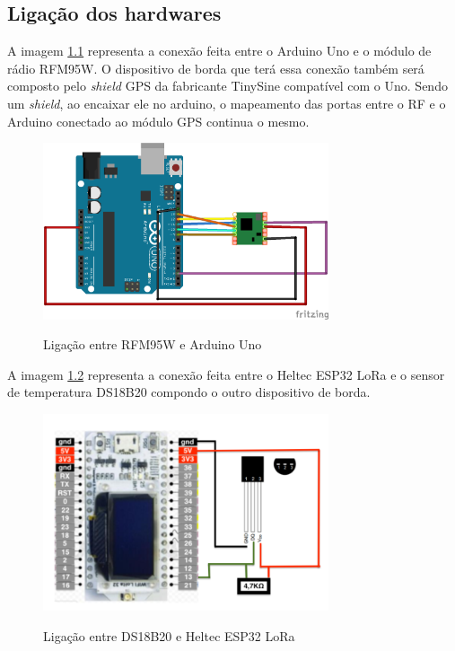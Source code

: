 \documentclass[
    hidelinks,
	12pt,				%
	openany,
	oneside, 
	a4paper,			%
	english,			%
	french,				%
	spanish,			%
	brazil				%
	]{abntex2}
\begin{document}

\begin{anexosenv}

\partanexos

\chapter{Ligação dos hardwares} \label{anexohardware}

A imagem \ref{fig:unowire} representa a conexão feita entre o Arduino Uno e o módulo de rádio RFM95W. O dispositivo de borda que terá essa conexão também será composto pelo \textit{shield} GPS da fabricante TinySine compatível com o Uno. Sendo um \textit{shield}, ao encaixar ele no arduino, o mapeamento das portas entre o RF e o Arduino conectado ao módulo GPS continua o mesmo.
\begin{figure}[ht]
    \centering
    \caption{Ligação entre RFM95W e Arduino Uno}
    \includegraphics[width=0.75\textwidth]{unowire.png}
    \label{fig:unowire}
\end{figure}


A imagem \ref{fig:esp32wire} representa a conexão feita entre o Heltec ESP32 LoRa e o sensor de temperatura DS18B20 compondo o outro dispositivo de borda.
\begin{figure}[ht]
    \centering
    \caption{Ligação entre DS18B20 e Heltec ESP32 LoRa}
    \includegraphics[width=0.75\textwidth]{esp32wire.png}
    \label{fig:esp32wire}
\end{figure}


\end{anexosenv}
\end{document}
